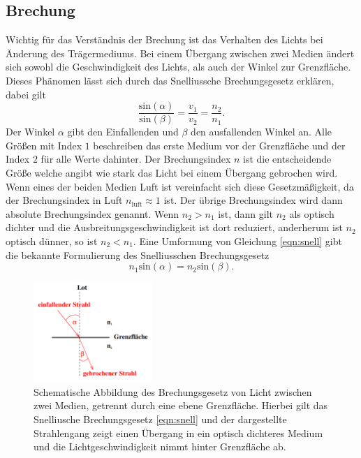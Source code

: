 \subsection{Brechung}
Wichtig für das Verständnis der Brechung ist das Verhalten des Lichts bei Änderung des Trägermediums. Bei einem Übergang zwischen zwei Medien ändert sich sowohl die Geschwindigkeit des Lichts, als auch der Winkel zur Grenzfläche.
Dieses Phänomen lässt sich durch das Snelliussche Brechungsgesetz erklären, dabei gilt \cite{skript}
\begin{equation}
    \label{eqn:snell}
    \frac{\text{sin}(\alpha)}{\text{sin} (\beta)} = \frac{v_1}{v_2} = \frac{n_2}{n_1}.
\end{equation}
Der Winkel $\alpha$ gibt den Einfallenden und $\beta$ den ausfallenden Winkel an. Alle Größen mit Index $1$ beschreiben das erste Medium vor der Grenzfläche und der Index $2$ für alle Werte dahinter. Der Brechungsindex $n$ ist die
entscheidende Größe welche angibt wie stark das Licht bei einem Übergang gebrochen wird. Wenn eines der beiden Medien Luft ist vereinfacht sich diese Gesetzmäßigkeit, da der Brechungsindex in Luft $n_{\text{luft}} \approx 1$ ist. Der übrige
Brechungsindex wird dann absolute Brechungsindex genannt.
Wenn $n_2 > n_1$ ist, dann gilt $n_2$ als optisch dichter und die Ausbreitungsgeschwindigkeit ist dort reduziert, anderherum ist $n_2$ optisch dünner, so ist $n_2 < n_1$.
Eine Umformung von Gleichung \eqref{eqn:snell} gibt die bekannte Formulierung des Snelliusschen Brechungsgesetz \cite{skript}
\begin{equation}
n_1 \text{sin}(\alpha) = n_2 \text{sin}(\beta).
\end{equation}
\begin{figure}
    \centering
    \includegraphics[width=0.4\textwidth]{bilder/2.png}
    \caption{Schematische Abbildung des Brechungsgesetz von Licht zwischen zwei Medien, getrennt durch eine ebene Grenzfläche. Hierbei gilt das Snelliusche Brechungsgesetz \eqref{eqn:snell} und der dargestellte Strahlengang zeigt einen Übergang in ein optisch
    dichteres Medium und die Lichtgeschwindigkeit nimmt hinter Grenzfläche ab.\cite{skript}}
    \label{fig:brechung}
\end{figure}

